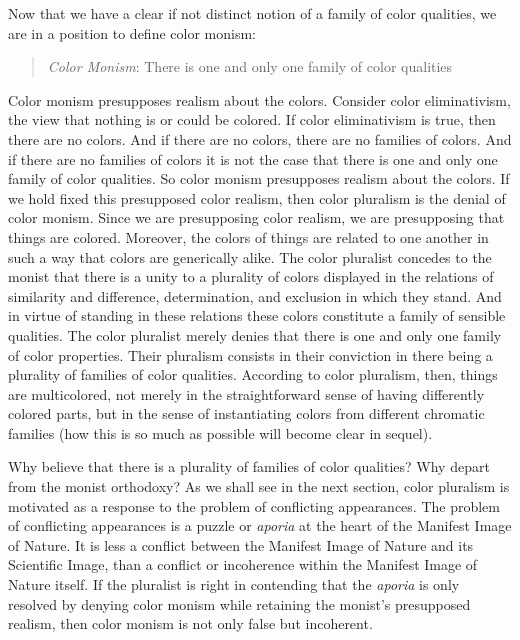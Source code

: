 \documentclass[12pt]{article}
\begin{document}
Now that we have a clear if not distinct notion of a family of color qualities, we are in a position to define color monism:
\begin{quote}
	\emph{Color Monism}: There is one and only one family of color qualities
\end{quote}
Color monism presupposes realism about the colors. Consider color eliminativism, the view that nothing is or could be colored. If color eliminativism is true, then there are no colors. And if there are no colors, there are no families of colors. And if there are no families of colors it is not the case that there is one and only one family of color qualities. So color monism presupposes realism about the colors. If we hold fixed this presupposed color realism, then color pluralism is the denial of color monism. Since we are presupposing color realism, we are presupposing that things are colored. Moreover, the colors of things are related to one another in such a way that colors are generically alike. The color pluralist concedes to the monist that there is a unity to a plurality of colors displayed in the relations of similarity and difference, determination, and exclusion in which they stand. And in virtue of standing in these relations these colors constitute a family of sensible qualities. The color pluralist merely denies that there is one and only one family of color properties. Their pluralism consists in their conviction in there being a plurality of families of color qualities. According to color pluralism, then, things are multicolored, not merely in the straightforward sense of having differently colored parts, but in the sense of instantiating colors from different chromatic families (how this is so much as possible will become clear in sequel).

Why believe that there is a plurality of families of color qualities? Why depart from the monist orthodoxy? As we shall see in the next section, color pluralism is motivated as a response to the problem of conflicting appearances. The problem of conflicting appearances is a puzzle or \emph{aporia} at the heart of the Manifest Image of Nature. It is less a conflict between the Manifest Image of Nature and its Scientific Image, than a conflict or incoherence within the Manifest Image of Nature itself. If the pluralist is right in contending that the \emph{aporia} is only resolved by denying color monism while retaining the monist's presupposed realism, then color monism is not only false but incoherent.

\end{document}
